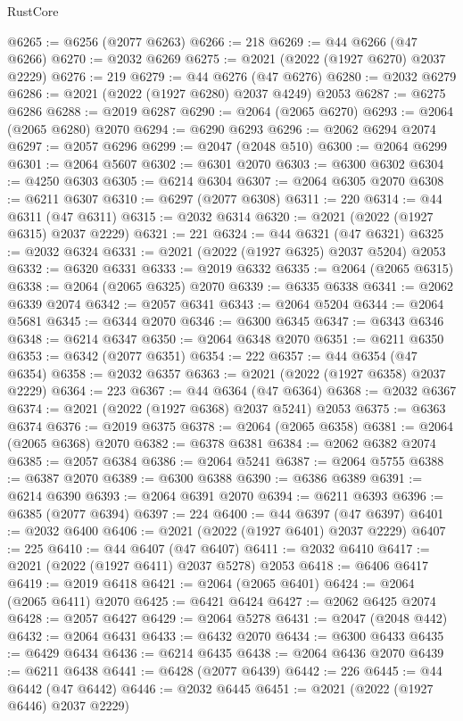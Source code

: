 \begin{lexlean}{RustCore}
\begin{coremodule}
@6265 := @6256 (@2077 @6263)
@6266 := 218
@6269 := @44 @6266 (@47 @6266)
@6270 := @2032 @6269
@6275 := @2021 (@2022 (@1927 @6270) @2037 @2229)
@6276 := 219
@6279 := @44 @6276 (@47 @6276)
@6280 := @2032 @6279
@6286 := @2021 (@2022 (@1927 @6280) @2037 @4249) @2053
@6287 := @6275 @6286
@6288 := @2019 @6287
@6290 := @2064 (@2065 @6270)
@6293 := @2064 (@2065 @6280) @2070
@6294 := @6290 @6293
@6296 := @2062 @6294 @2074
@6297 := @2057 @6296
@6299 := @2047 (@2048 @510)
@6300 := @2064 @6299
@6301 := @2064 @5607
@6302 := @6301 @2070
@6303 := @6300 @6302
@6304 := @4250 @6303
@6305 := @6214 @6304
@6307 := @2064 @6305 @2070
@6308 := @6211 @6307
@6310 := @6297 (@2077 @6308)
@6311 := 220
@6314 := @44 @6311 (@47 @6311)
@6315 := @2032 @6314
@6320 := @2021 (@2022 (@1927 @6315) @2037 @2229)
@6321 := 221
@6324 := @44 @6321 (@47 @6321)
@6325 := @2032 @6324
@6331 := @2021 (@2022 (@1927 @6325) @2037 @5204) @2053
@6332 := @6320 @6331
@6333 := @2019 @6332
@6335 := @2064 (@2065 @6315)
@6338 := @2064 (@2065 @6325) @2070
@6339 := @6335 @6338
@6341 := @2062 @6339 @2074
@6342 := @2057 @6341
@6343 := @2064 @5204
@6344 := @2064 @5681
@6345 := @6344 @2070
@6346 := @6300 @6345
@6347 := @6343 @6346
@6348 := @6214 @6347
@6350 := @2064 @6348 @2070
@6351 := @6211 @6350
@6353 := @6342 (@2077 @6351)
@6354 := 222
@6357 := @44 @6354 (@47 @6354)
@6358 := @2032 @6357
@6363 := @2021 (@2022 (@1927 @6358) @2037 @2229)
@6364 := 223
@6367 := @44 @6364 (@47 @6364)
@6368 := @2032 @6367
@6374 := @2021 (@2022 (@1927 @6368) @2037 @5241) @2053
@6375 := @6363 @6374
@6376 := @2019 @6375
@6378 := @2064 (@2065 @6358)
@6381 := @2064 (@2065 @6368) @2070
@6382 := @6378 @6381
@6384 := @2062 @6382 @2074
@6385 := @2057 @6384
@6386 := @2064 @5241
@6387 := @2064 @5755
@6388 := @6387 @2070
@6389 := @6300 @6388
@6390 := @6386 @6389
@6391 := @6214 @6390
@6393 := @2064 @6391 @2070
@6394 := @6211 @6393
@6396 := @6385 (@2077 @6394)
@6397 := 224
@6400 := @44 @6397 (@47 @6397)
@6401 := @2032 @6400
@6406 := @2021 (@2022 (@1927 @6401) @2037 @2229)
@6407 := 225
@6410 := @44 @6407 (@47 @6407)
@6411 := @2032 @6410
@6417 := @2021 (@2022 (@1927 @6411) @2037 @5278) @2053
@6418 := @6406 @6417
@6419 := @2019 @6418
@6421 := @2064 (@2065 @6401)
@6424 := @2064 (@2065 @6411) @2070
@6425 := @6421 @6424
@6427 := @2062 @6425 @2074
@6428 := @2057 @6427
@6429 := @2064 @5278
@6431 := @2047 (@2048 @442)
@6432 := @2064 @6431
@6433 := @6432 @2070
@6434 := @6300 @6433
@6435 := @6429 @6434
@6436 := @6214 @6435
@6438 := @2064 @6436 @2070
@6439 := @6211 @6438
@6441 := @6428 (@2077 @6439)
@6442 := 226
@6445 := @44 @6442 (@47 @6442)
@6446 := @2032 @6445
@6451 := @2021 (@2022 (@1927 @6446) @2037 @2229)

\end{coremodule}
\end{lexlean}
